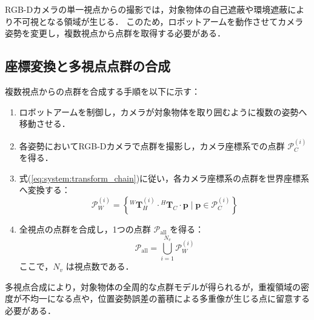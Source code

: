 RGB-Dカメラの単一視点からの撮影では，対象物体の自己遮蔽や環境遮蔽により不可視となる領域が生じる．
このため，ロボットアームを動作させてカメラ姿勢を変更し，複数視点から点群を取得する必要がある．



\subsection{座標変換と多視点点群の合成}
\label{sec:system:pointcloud:acquisition:multi-view-fusion}
複数視点からの点群を合成する手順を以下に示す：

\begin{enumerate}
  \item ロボットアームを制御し，カメラが対象物体を取り囲むように複数の姿勢へ移動させる．
  \item 各姿勢においてRGB-Dカメラで点群を撮影し，カメラ座標系での点群 $\mathcal{P}_{C}^{(i)}$ を得る．
  \item 式(\ref{eq:system:transform_chain})に従い，各カメラ座標系の点群を世界座標系へ変換する：
  \begin{equation}
    \mathcal{P}_{W}^{(i)} = \left\{ {}^{W}\bm{T}_{H}^{(i)} \cdot {}^{H}\bm{T}_{C} \cdot \bm{p} \;|\; \bm{p} \in \mathcal{P}_{C}^{(i)} \right\}
  \end{equation}
  \item 全視点の点群を合成し，1つの点群 $\mathcal{P}_{\mathrm{all}}$ を得る：
  \begin{equation}
    \mathcal{P}_{\mathrm{all}} = \bigcup_{i=1}^{N_v} \mathcal{P}_{W}^{(i)}
  \end{equation}
  ここで，$N_v$ は視点数である．
\end{enumerate}

多視点合成により，対象物体の全周的な点群モデルが得られるが，重複領域の密度が不均一になる点や，位置姿勢誤差の蓄積による多重像が生じる点に留意する必要がある．




